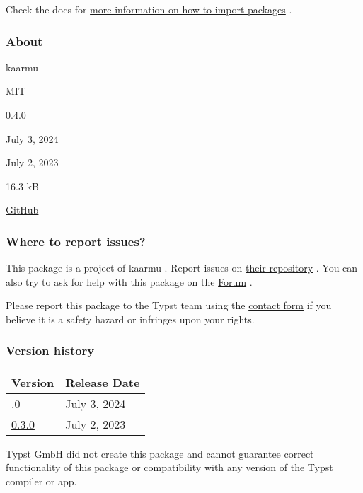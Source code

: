 

Check the docs for
\href{https://typst.app/docs/reference/scripting/\#packages}{more
information on how to import packages} .

\subsubsection{About}\label{about}

\begin{description}
\tightlist
\item[Author :]
kaarmu
\item[License:]
MIT
\item[Current version:]
0.4.0
\item[Last updated:]
July 3, 2024
\item[First released:]
July 2, 2023
\item[Archive size:]
16.3 kB
\href{https://packages.typst.org/preview/splash-0.4.0.tar.gz}{\pandocbounded{}}
\item[Repository:]
\href{https://github.com/kaarmu/typst-palettes}{GitHub}
\end{description}

\subsubsection{Where to report issues?}\label{where-to-report-issues}

This package is a project of kaarmu . Report issues on
\href{https://github.com/kaarmu/typst-palettes}{their repository} . You
can also try to ask for help with this package on the
\href{https://forum.typst.app}{Forum} .

Please report this package to the Typst team using the
\href{https://typst.app/contact}{contact form} if you believe it is a
safety hazard or infringes upon your rights.

\label{versions}
\subsubsection{Version history}\label{version-history}

\begin{longtable}[]{@{}ll@{}}
\toprule\noalign{}
Version & Release Date \\
\midrule\noalign{}
\endhead
\bottomrule\noalign{}
\endlastfoot
0.4.0 & July 3, 2024 \\
\href{https://typst.app/universe/package/splash/0.3.0/}{0.3.0} & July 2,
2023 \\
\end{longtable}

Typst GmbH did not create this package and cannot guarantee correct
functionality of this package or compatibility with any version of the
Typst compiler or app.
